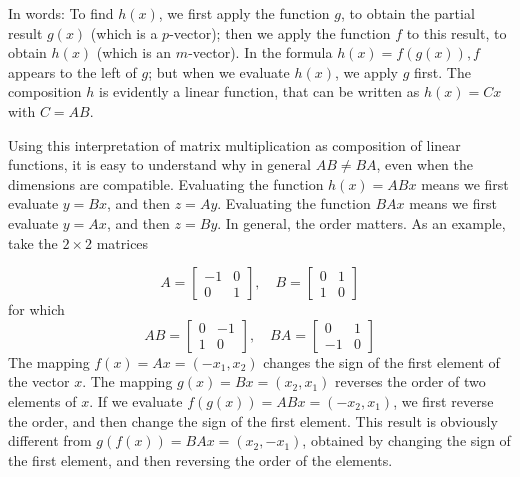 In words: To find $ h(x) $, we first apply the function $ g $, to obtain the partial result $ g(x) $ (which is a $ p $-vector); then we apply the function $ f $ to this result, to obtain $ h(x) $ (which is an $ m $-vector). In the formula $ h(x)=f(g(x)), f $ appears to the left of $ g $; but when we evaluate $ h(x) $, we apply $ g $ first. The composition $ h $ is evidently a linear function, that can be written as $ h(x)=C x $ with $ C=A B $.


Using this interpretation of matrix multiplication as composition of linear functions, it is easy to understand why in general $ A B \neq B A $, even when the dimensions are compatible. Evaluating the function $ h(x)=A B x $ means we first evaluate $ y=B x $, and then $ z=A y $. Evaluating the function $ B A x $ means we first evaluate $ y=A x $, and then $ z=B y $. In general, the order matters. As an example, take the $ 2 \times 2 $ matrices

\begin{example}
    \begin{equation}
A=\left[\begin{array}{rr}
-1 & 0 \\
0 & 1
\end{array}\right], \quad B=\left[\begin{array}{ll}
0 & 1 \\
1 & 0
\end{array}\right]
\end{equation}
for which
\begin{equation}
A B=\left[\begin{array}{rr}
0 & -1 \\
1 & 0
\end{array}\right], \quad B A=\left[\begin{array}{rr}
0 & 1 \\
-1 & 0
\end{array}\right]
\end{equation}
The mapping $ f(x)=A x=\left(-x_{1}, x_{2}\right) $ changes the sign of the first element of the vector $ x $. The mapping $ g(x)=B x=\left(x_{2}, x_{1}\right) $ reverses the order of two elements of $ x $. If we evaluate $ f(g(x))=A B x=\left(-x_{2}, x_{1}\right) $, we first reverse the order, and then change the sign of the first element. This result is obviously different from $ g(f(x))=B A x=\left(x_{2},-x_{1}\right) $, obtained by changing the sign of the first element, and then reversing the order of the elements.
\end{example}



